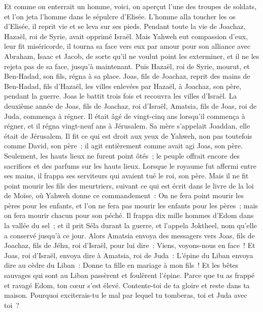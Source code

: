 \begin{multicols}{2}
Et comme on enterrait un homme, voici, on aperçut l'une des troupes de soldats, et l'on jeta l'homme dans le sépulcre d'Elisée. L'homme alla toucher les os d'Elisée, il reprit vie et se leva sur ses pieds.
Pendant toute la vie de Joachaz, Hazaël, roi de Syrie, avait opprimé Israël.
Mais Yahweh eut compassion d'eux, leur fit miséricorde, il tourna sa face vers eux par amour pour son alliance avec Abraham, Isaac et Jacob, de sorte qu'il ne voulut point les exterminer, et il ne les rejeta pas de sa face, jusqu'à maintenant.
Puis Hazaël, roi de Syrie, mourut, et Ben-Hadad, son fils, régna à sa place.
Joas, fils de Joachaz, reprit des mains de Ben-Hadad, fils d'Hazaël, les villes enlevées par Hazaël, à Joachaz, son père, pendant la guerre. Joas le battit trois fois et recouvra les villes d'Israël.
\VerseOne{}La deuxième année de Joas, fils de Joachaz, roi d'Israël, Amatsia, fils de Joas, roi de Juda, commença à régner.
Il était âgé de vingt-cinq ans lorsqu'il commença à régner, et il régna vingt-neuf ans à Jérusalem. Sa mère s'appelait Joaddan, elle était de Jérusalem.
Il fit ce qui est droit aux yeux de Yahweh, non pas toutefois comme David, son père~; il agit entièrement comme avait agi Joas, son père.
Seulement, les hauts lieux ne furent point ôtés~; le peuple offrait encore des sacrifices et des parfums sur les hauts lieux.
Lorsque le royaume fut affermi entre ses mains, il frappa ses serviteurs qui avaient tué le roi, son père.
Mais il ne fit point mourir les fils des meurtriers, suivant ce qui est écrit dans le livre de la loi de Moïse, où Yahweh donne ce commandement~: On ne fera point mourir les pères pour les enfants, et l'on ne fera pas mourir les enfants pour les pères~; mais on fera mourir chacun pour son péché.
Il frappa dix mille hommes d'Edom dans la vallée du sel~; et il prit Séla durant la guerre, et l'appela Joktheel, nom qu'elle a conservé jusqu'à ce jour.
Alors Amatsia envoya des messagers vers Joas, fils de Joachaz, fils de Jéhu, roi d'Israël, pour lui dire~: Viens, voyons-nous en face~!
Et Joas, roi d'Israël, envoya dire à Amatsia, roi de Juda~: L'épine du Liban envoya dire au cèdre du Liban~: Donne ta fille en mariage à mon fils~! Et les bêtes sauvages qui sont au Liban passèrent et foulèrent l'épine.
Parce que tu as frappé et ravagé Edom, ton cœur s'est élevé. Contente-toi de ta gloire et reste dans ta maison. Pourquoi exciterais-tu le mal par lequel tu tomberas, toi et Juda avec toi~?

\end{multicols}
